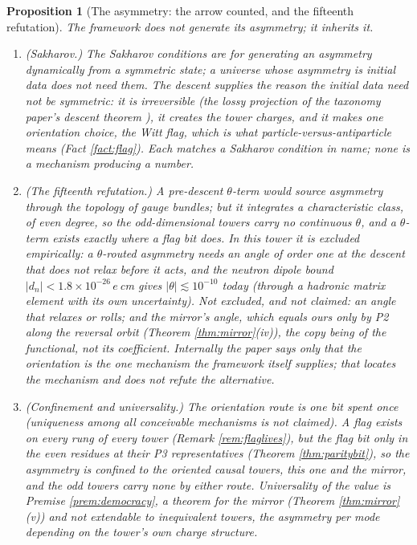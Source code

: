 \documentclass[11pt]{article}
\newtheorem{proposition}[theorem]{Proposition}
\theoremstyle{definition}
\begin{document}
\begin{proposition}[The asymmetry: the arrow counted, and the fifteenth refutation]\label{prop:arrow}
The framework does not generate its asymmetry; it inherits it.
\begin{enumerate}
\item[(i)] \emph{(Sakharov.)} The Sakharov conditions are for generating an asymmetry dynamically from a symmetric state; a universe whose asymmetry is initial data does not need them. The descent supplies the reason the initial data need not be symmetric: it is irreversible (the lossy projection of the taxonomy paper's descent theorem \cite{ButlerT1}), it creates the tower charges, and it makes one orientation choice, the Witt flag, which is what particle-versus-antiparticle means (Fact \ref{fact:flag}). Each matches a Sakharov condition in name; none is a mechanism producing a number.
\item[(ii)] \emph{(The fifteenth refutation.)} A pre-descent $\theta$-term would source asymmetry through the topology of gauge bundles; but it integrates a characteristic class, of even degree, so the odd-dimensional towers carry no continuous $\theta$, and a $\theta$-term exists exactly where a flag bit does. In this tower it is excluded empirically: a $\theta$-routed asymmetry needs an angle of order one at the descent that does not relax before it acts, and the neutron dipole bound $|d_{n}| < 1.8 \times 10^{-26}\,e\,$cm \cite{Abel2020} gives $|\theta| \lesssim 10^{-10}$ today (through a hadronic matrix element with its own uncertainty). Not excluded, and not claimed: an angle that relaxes or rolls; and the mirror's angle, which equals ours only by P2 along the reversal orbit (Theorem \ref{thm:mirror}(iv)), the copy being of the functional, not its coefficient. Internally the paper says only that the orientation is the one mechanism the framework itself supplies; that locates the mechanism and does not refute the alternative.
\item[(iii)] \emph{(Confinement and universality.)} The orientation route is one bit spent once (uniqueness among all conceivable mechanisms is not claimed). A flag exists on every rung of every tower (Remark \ref{rem:flaglives}), but the flag \emph{bit} only in the even residues at their P3 representatives (Theorem \ref{thm:paritybit}), so the asymmetry is confined to the oriented causal towers, this one and the mirror, and the odd towers carry none by either route. Universality of the value is Premise \ref{prem:democracy}, a theorem for the mirror (Theorem \ref{thm:mirror}(v)) and not extendable to inequivalent towers, the asymmetry per mode depending on the tower's own charge structure.

\end{enumerate}
\end{proposition}
\end{document}
